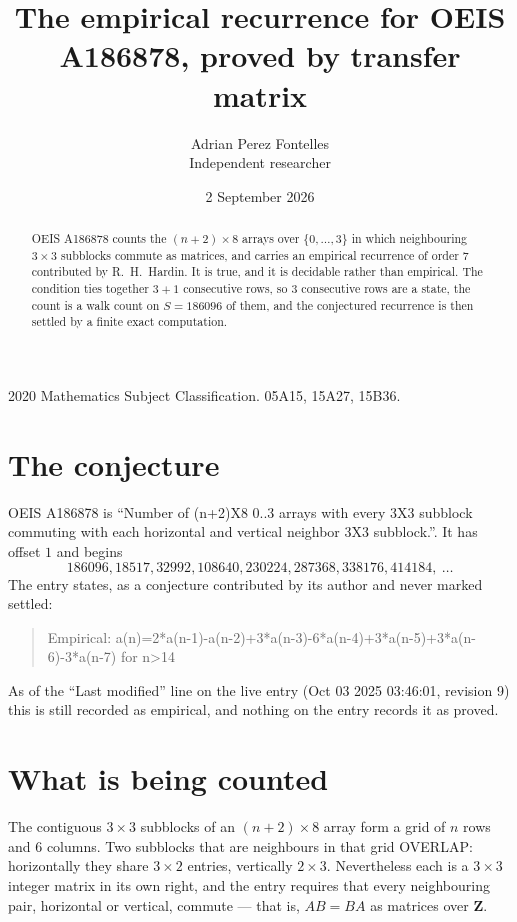 \documentclass[11pt,a4paper]{article}
\title{The empirical recurrence for OEIS A186878, proved by transfer matrix}
\author{Adrian Perez Fontelles\\ \small Independent researcher}
\date{2 September 2026}
\theoremstyle{plain}
\theoremstyle{definition}
\begin{document}
\maketitle

\begin{abstract}
OEIS A186878 counts the $(n+2)\times8$ arrays over $\{0,\dots,3\}$ in which
neighbouring $3\times3$ subblocks commute as matrices, and carries an empirical
recurrence
of order $7$ contributed by R.~H.~Hardin. It is true, and it is decidable rather than
empirical. The condition ties together $3+1$ consecutive rows, so $3$ consecutive rows are
a state, the count is a walk count on $S=186096$ of them, and the conjectured recurrence is then
settled by a finite exact computation.
\end{abstract}

\noindent\small 2020 Mathematics Subject Classification. 05A15, 15A27, 15B36.\normalsize

\section{The conjecture}

OEIS A186878 is ``Number of (n+2)X8 0..3 arrays with every 3X3 subblock commuting with each horizontal and vertical neighbor 3X3 subblock.''. It has offset $1$ and begins
\[
186096, 18517, 32992, 108640, 230224, 287368, 338176, 414184,\ \dots
\]
The entry states, as a conjecture contributed by its author and never marked settled:
\begin{quote}
Empirical: a(n)=2*a(n-1)-a(n-2)+3*a(n-3)-6*a(n-4)+3*a(n-5)+3*a(n-6)-3*a(n-7) for n>14
\end{quote}
As of the ``Last modified'' line on the live entry (Oct 03 2025 03:46:01, revision 9) this is still
recorded as empirical, and nothing on the entry records it as proved.

\section{What is being counted}

The contiguous $3\times3$ subblocks of an $(n+2)\times8$ array form a grid of $n$
rows and $6$ columns. Two subblocks that are neighbours in that
grid OVERLAP: horizontally they share $3\times2$ entries, vertically
$2\times3$. Nevertheless each is a $3\times3$ integer matrix in its own right, and
the entry requires that every neighbouring pair, horizontal or vertical, commute --- that is,
$AB=BA$ as matrices over $\mathbf{Z}$.
\end{document}
